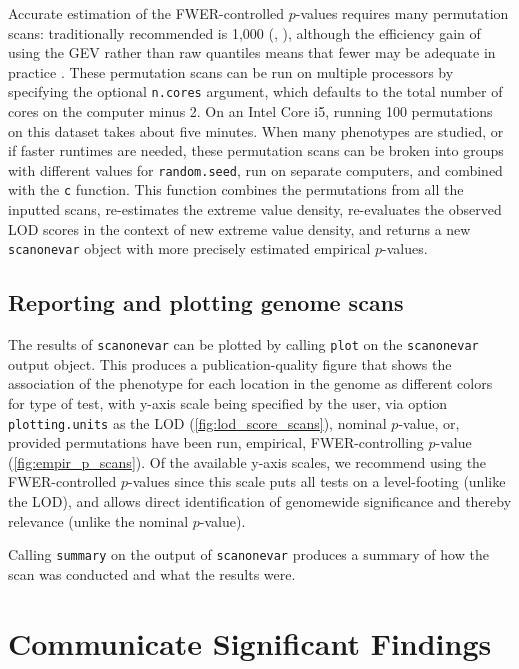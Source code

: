 \documentclass[9pt,twocolumn,twoside]{gsag3jnl}
\begin{document}
Accurate estimation of the FWER-controlled $p$-values requires many permutation scans: traditionally recommended is 1,000 (\eg, \citealt{Churchill1994,Carlborg2002}), although the efficiency gain of using the GEV rather than raw quantiles means that fewer may be adequate in practice \citep{Valdar06cc}.
These permutation scans can be run on multiple processors by specifying the optional \texttt{n.cores} argument, which defaults to the total number of cores on the computer minus 2.
On an Intel Core i5, running 100 permutations on this dataset takes about five minutes.
When many phenotypes are studied, or if faster runtimes are needed, these permutation scans can be broken into groups with different values for \texttt{random.seed}, run on separate computers, and combined with the \texttt{c} function.
This function combines the permutations from all the inputted scans, re-estimates the extreme value density, re-evaluates the observed LOD scores in the context of new extreme value density, and returns a new \texttt{scanonevar} object with more precisely estimated empirical $p$-values.

\subsection*{Reporting and plotting genome scans}

The results of \texttt{scanonevar} can be plotted by calling \texttt{plot} on the \texttt{scanonevar} output object. This produces a publication-quality figure that shows the association of the phenotype for each location in the genome as different colors for type of test, with y-axis scale being specified by the user, via option \texttt{plotting.units} as the LOD (\autoref{fig:lod_score_scans}), nominal $p$-value, or, provided permutations have been run, empirical, FWER-controlling $p$-value (\autoref{fig:empir_p_scans}). Of the available y-axis scales, we recommend using the FWER-controlled $p$-values since this scale puts all tests on a level-footing (unlike the LOD), and allows direct identification of genomewide significance and thereby relevance (unlike the nominal $p$-value).

Calling \texttt{summary} on the output of \texttt{scanonevar} produces a summary of how the scan was conducted and what the results were.


\section*{Communicate Significant Findings}
\end{document}
